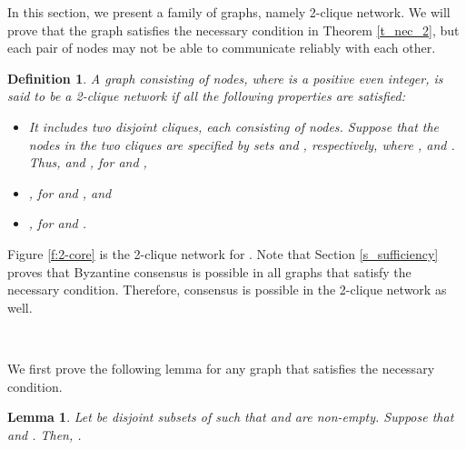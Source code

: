 \documentclass[letterpaper, 11pt]{article}
\newtheorem{definition}{Definition}
\newtheorem{lemma}{Lemma}
\begin{document}
In this section, we present a family of graphs, namely 2-clique network. We will prove that the graph satisfies the necessary condition in Theorem \ref{t_nec_2}, but each pair of nodes may not be able to communicate reliably with each other. 

\begin{definition}
\label{def:dual}
A graph  consisting of  nodes, where  is a positive even integer, is said to be a {\em 2-clique network} if all the following properties are satisfied: 

\begin{itemize}
\item It includes two disjoint cliques, each consisting of  nodes.
Suppose that the nodes in the two cliques are specified by sets  and ,
respectively, where ,
and .
Thus,  and , for  and ,
\item , for  
		and , and
\item , for  
		and .
\end{itemize}
\end{definition}
Figure \ref{f:2-core} is the 2-clique network for . Note that Section \ref{s_sufficiency} proves that Byzantine consensus is possible in all graphs that satisfy the necessary condition. Therefore, consensus is possible in the 2-clique network as well. 

~

We first prove the following lemma for any graph  that satisfies the necessary
condition.

\begin{lemma}
\label{lemma:AtoBC}
Let  be disjoint subsets of  such that  and  are non-empty. Suppose that  and . Then, .
\end{lemma}
\end{document}
